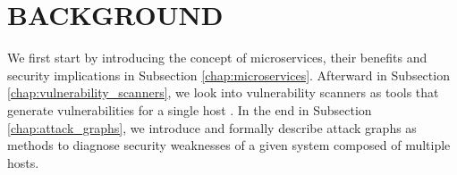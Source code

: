 \section{BACKGROUND}
\label{chap:background}

We first start by introducing the concept of microservices, their benefits and security implications in Subsection \ref{chap:microservices}. Afterward in Subsection \ref{chap:vulnerability_scanners}, we look into vulnerability scanners as tools that generate vulnerabilities for a single host . In the end in Subsection \ref{chap:attack_graphs}, we introduce and formally describe attack graphs as methods to diagnose security weaknesses of a given system composed of multiple hosts.





